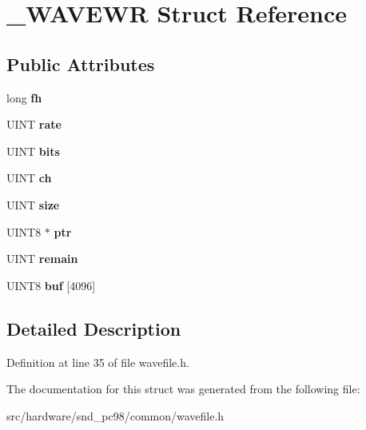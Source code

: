 \hypertarget{struct__WAVEWR}{\section{\-\_\-\-W\-A\-V\-E\-W\-R Struct Reference}
\label{struct__WAVEWR}
}
\subsection*{Public Attributes}
\begin{DoxyCompactItemize}
\item 
\hypertarget{struct__WAVEWR_a0d15f9cb8ce3a0772daa05d8fdd5947f}{long {\bfseries fh}}\label{struct__WAVEWR_a0d15f9cb8ce3a0772daa05d8fdd5947f}

\item 
\hypertarget{struct__WAVEWR_ae2cc568f47db7c9bcd02253916f81e66}{U\-I\-N\-T {\bfseries rate}}\label{struct__WAVEWR_ae2cc568f47db7c9bcd02253916f81e66}

\item 
\hypertarget{struct__WAVEWR_afa1825ce9c33dcb90e6d766190e46537}{U\-I\-N\-T {\bfseries bits}}\label{struct__WAVEWR_afa1825ce9c33dcb90e6d766190e46537}

\item 
\hypertarget{struct__WAVEWR_af1c15426779e7b14b267d086685d58f6}{U\-I\-N\-T {\bfseries ch}}\label{struct__WAVEWR_af1c15426779e7b14b267d086685d58f6}

\item 
\hypertarget{struct__WAVEWR_aabdba6fe21ead74f2a3634dd8251a17f}{U\-I\-N\-T {\bfseries size}}\label{struct__WAVEWR_aabdba6fe21ead74f2a3634dd8251a17f}

\item 
\hypertarget{struct__WAVEWR_ab727b253362b5def2136444ed5d3b0eb}{U\-I\-N\-T8 $\ast$ {\bfseries ptr}}\label{struct__WAVEWR_ab727b253362b5def2136444ed5d3b0eb}

\item 
\hypertarget{struct__WAVEWR_ac2bf883262e3d45fe5ca59b1549ec07e}{U\-I\-N\-T {\bfseries remain}}\label{struct__WAVEWR_ac2bf883262e3d45fe5ca59b1549ec07e}

\item 
\hypertarget{struct__WAVEWR_ac6607bbb72e95ff3c1dfb13ecd69eb28}{U\-I\-N\-T8 {\bfseries buf} \mbox{[}4096\mbox{]}}\label{struct__WAVEWR_ac6607bbb72e95ff3c1dfb13ecd69eb28}

\end{DoxyCompactItemize}


\subsection{Detailed Description}


Definition at line 35 of file wavefile.\-h.



The documentation for this struct was generated from the following file\-:\begin{DoxyCompactItemize}
\item 
src/hardware/snd\-\_\-pc98/common/wavefile.\-h\end{DoxyCompactItemize}
